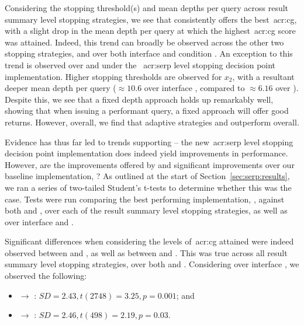 Considering the stopping threshold(s) and mean depths per query across result summary level stopping strategies, we see that  consistently offers the best~\gls{acr:cg}, with a slight drop in the mean depth per query at which the highest~\gls{acr:cg} score was attained. Indeed, this trend can broadly be observed across the other two stopping strategies, and over both interface  and condition . An exception to this trend is observed over  and  under the ~\gls{acr:serp} level stopping decision point implementation. Higher stopping thresholds are observed for $x_2$, with a resultant deeper mean depth per query ($\approx10.6$ over interface , compared to $\approx6.16$ over ). Despite this, we see that a fixed depth approach holds up remarkably well, showing that when issuing a performant query, a fixed approach will offer good returns. However, overall, we find that adaptive strategies  and  outperform  overall.

Evidence has thus far led to trends supporting  -- the new~\gls{acr:serp} level stopping decision point implementation does indeed yield improvements in performance. However, are the improvements offered by  and  significant improvements over our baseline implementation, ? As outlined at the start of Section~\ref{sec:serp:results}, we ran a series of two-tailed Student's t-tests to determine whether this was the case. Tests were run comparing the best performing implementation, , against both  and , over each of the result summary level stopping strategies, as well as over interface  and .

Significant differences when considering the levels of~\gls{acr:cg} attained were indeed observed between  and , as well as between  and . This was true across all result summary level stopping strategies, over both  and . Considering  over interface , we observed the following:

\begin{itemize}
    \item{ $\rightarrow$ : $SD=2.43, t(2748)=3.25, p=0.001$; and}
    \item{ $\rightarrow$ : $SD=2.46, t(498)=2.19, p=0.03$.}
\end{itemize}

